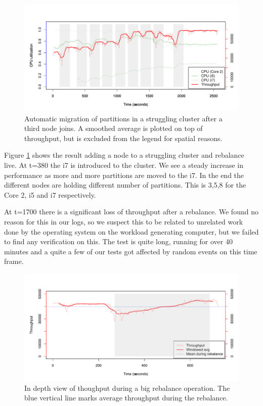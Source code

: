 \clearpage
\begin{figure}[h]
    \centering
    \includegraphics[width=1.0\textwidth]{results/adaptive3node}
    \caption{Automatic migration of partitions in a struggling cluster after a third node joins. A smoothed average is plotted on top of throughput, but is excluded from the legend for spatial reasons.}
    \label{fig:adapt_3node}
\end{figure}
Figure \ref{fig:adapt_3node} shows the result adding a node to a struggling cluster and rebalance live. At t=380 the i7 is introduced to the cluster. We see a steady increase in performance as more and more partitions are moved to the i7. In the end the different nodes are holding different number of partitions. This is 3,5,8 for the Core 2, i5 and i7 respectively. 

At t=1700 there is a significant loss of throughput after a rebalance. We found no reason for this in our logs, so we suspect this to be related to unrelated work done by the operating system on the workload generating computer, but we failed to find any verification on this. The test is quite long, running for over 40 minutes and a quite a few of our tests got affected by random events on this time frame.

\clearpage
\begin{figure}[h]
    \centering
    \includegraphics[width=1.0\textwidth]{results/throughput/adaptive/zookeeper/auto_3nodes_muchdata_wow}
    \caption{In depth view of thoughput during a big rebalance operation. The blue vertical line marks average throughput during the rebalance.}
    \label{fig:adapt_big_rebalance}
\end{figure}

